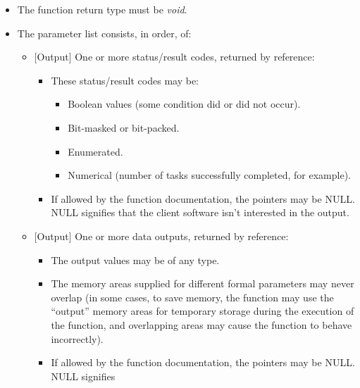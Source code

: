 \begin{itemize}
\item The function return type must be \emph{void}.
\item The parameter list consists, in order, of:
      \begin{itemize}
      \item $[$Output$]$ One or more status/result codes,
            returned by reference:
            \begin{itemize}
            \item These status/result codes may be:
                  \begin{itemize}
                  \item Boolean values (some condition did
                        or did not occur).
                  \item Bit-masked or bit-packed.
                  \item Enumerated.
                  \item Numerical (number of tasks
                        successfully completed, for 
                        example).
                  \end{itemize}
            \item If allowed by the function documentation,
                  the
                  pointers may be NULL\@.  NULL signifies
                  that the client
                  software isn't interested in the output.
            \end{itemize}
      \item $[$Output$]$ One or more data outputs, returned
            by reference:
            \begin{itemize}
            \item The output values may be of any type.
            \item The memory areas supplied for different
                  formal parameters
                  may never overlap (in some cases, to save
                  memory, the
                  \emph{\productbasenameshort{}} function
                  may use the
                  ``output'' memory areas for temporary
                  storage during the
                  execution of the function, and overlapping
                  areas may
                  cause the \emph{\productbasenameshort{}}
                  function to behave
                  incorrectly).
            \item If allowed by the function documentation,
                  the
                  pointers may be NULL\@.  NULL signifies

\end{itemize}
\end{itemize}
\end{itemize}
